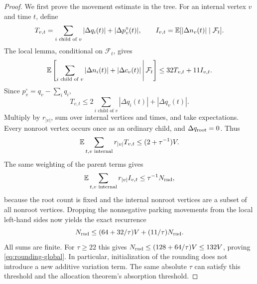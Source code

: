 \begin{proof}
We first prove the movement estimate in the tree.  For an internal vertex
$v$ and time $t$, define
\[
 T_{v,t}=\sum_{i\text{ child of }v}|\Delta q_i(t)|
                                      +|\Delta p_v^\circ(t)|,
 \qquad
 I_{v,t}=\mathbb E[|\Delta n_v(t)|\mid\mathcal F_t].
\]
The local lemma, conditional on $\mathcal F_t$, gives
\[
 \mathbb E\left[\sum_{i\text{ child of }v}|\Delta n_i(t)|
                          +|\Delta c_v(t)|\,\middle|\,\mathcal F_t\right]
                                  \le32T_{v,t}+11I_{v,t}.
\]
Since $p_v^\circ=q_v-\sum_iq_i$,
\[
 T_{v,t}\le2\sum_{i\text{ child of }v}|\Delta q_i(t)|
                                          +|\Delta q_v(t)|.
\]
Multiply by $r_{|v|}$, sum over internal vertices and times, and take
expectations.  Every nonroot vertex occurs once as an ordinary child, and
$\Delta q_{\rm root}=0$.  Thus
\begin{equation}\label{eq:rounding-target-sum}
 \mathbb E\sum_{t,v\text{ internal}}r_{|v|}T_{v,t}
                                            \le(2+\tau^{-1})V.
\end{equation}
The same weighting of the parent terms gives
\begin{equation}\label{eq:rounding-parent-sum}
 \mathbb E\sum_{t,v\text{ internal}}r_{|v|}I_{v,t}
                                       \le\tau^{-1}N_{\rm rnd},
\end{equation}
because the root count is fixed and the internal nonroot vertices are a
subset of all nonroot vertices.  Dropping the nonnegative parking movements
from the local left-hand sides now yields the exact recurrence
\begin{equation}\label{eq:rounding-absorption}
 N_{\rm rnd}\le(64+32/\tau)V+(11/\tau)N_{\rm rnd}.
\end{equation}
All sums are finite.  For $\tau\ge22$ this gives
$N_{\rm rnd}\le(128+64/\tau)V\le132V$, proving
\eqref{eq:rounding-global}.  In particular, initialization of the rounding
does not introduce a new additive variation term.  The same absolute $\tau$
can satisfy this threshold and the allocation theorem's absorption threshold.


\end{proof}
